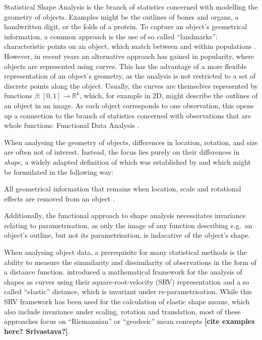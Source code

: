 Statistical Shape Analysis \parencite[see e.g.][]{DrydenMardia2016} is the branch of statistics concerned with modelling the geometry of objects.
Examples might be the outlines of bones and organs, a handwritten digit, or the folds of a protein.
To capture an object's geometrical information, a common approach is the use of so called \enquote{landmarks}: characteristic points on an object, which match between and within populations \parencite[see][3]{DrydenMardia2016}.
However, in recent years an alternative approach has gained in popularity, where objects are represented using curves.
This has the advantage of a more flexible representation of an object's geometry, as the analysis is not restricted to a set of discrete points along the object.
Usually, the curves are themselves represented by functions $\beta : [0,1] \rightarrow \mathbb{R}^k$, which, for example in 2D, might describe the outlines of an object in an image. 
As each object corresponds to one observation, this opens up a connection to the branch of statistics concerned with observations that are whole functions: Functional Data Analysis \parencite[see e.g.][]{RamsaySilverman2005}.

When analysing the geometry of objects, differences in location, rotation, and size are often not of interest.
Instead, the focus lies purely on their differences in  \textit{shape}, a widely adapted definition of which was established by \cite{Kendall1977} and which might be formulated in the following way:
\begin{definition}[Shape] 
    All geometrical information that remains when location, scale and rotational effects are removed from an object \parencite[see][1]{DrydenMardia2016}.
\end{definition}
\noindent Additionally, the functional approach to shape analysis necessitates invariance relating to parametrisation, as only the image of any function describing e.g.\ an object's outline, but not its parametrisation, is indacative of the object's shape.

When analysing object data, a prerequisite for many statistical methods is the ability to measure the simmilarity and dissimilarity of observations in the form of a distance function.
\cite{SrivastavaEtAl2011} introduced a mathematical framework for the analysis of shapes as curves using their square-root-velocity (SRV) representation and a so called \enquote{elastic} distance, which is invariant under re-parametrisation.
While this SRV framework has been used for the calculation of elastic shape means, which also include invariance under scaling, rotation and translation, most of these approaches focus on \enquote{Riemannian} or \enquote{geodesic} mean concepts \textbf{[cite examples here? Srivastava?]}.

